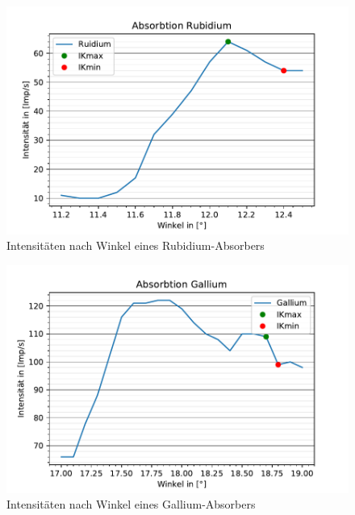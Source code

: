   \begin{figure}
    \centering
    \includegraphics{AbsorbtionsspektrumRubidium.pdf}
    \caption{Intensitäten nach Winkel eines Rubidium-Absorbers}
    \label{fig:EmspektrumVII}
  \end{figure}

  \begin{figure}
    \centering
    \includegraphics{AbsorbtionsspektrumGallium.pdf}
    \caption{Intensitäten nach Winkel eines Gallium-Absorbers}
    \label{fig:EmspektrumVIII}
  \end{figure}
